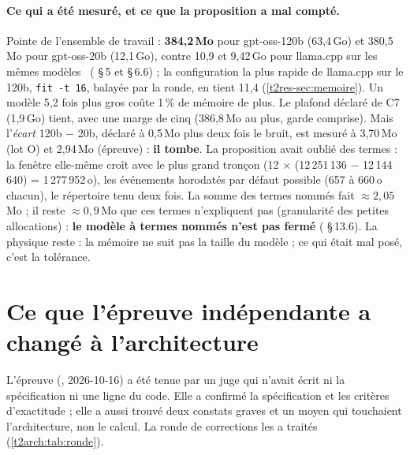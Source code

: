 \paragraph{Ce qui a été mesuré, et ce que la proposition a mal compté.} Pointe de l'ensemble de travail : \textbf{384,2\,Mo} pour gpt-oss-120b (63,4\,Go) et 380,5\,Mo pour gpt-oss-20b (12,1\,Go), contre 10,9 et 9,42\,Go pour llama.cpp sur les mêmes modèles \mes~( §\,5 et §\,6.6) ; la configuration la plus rapide de llama.cpp sur le 120b, \texttt{fit -t 16}, balayée par la ronde, en tient 11,4 (\cref{t2res-sec:memoire}). Un modèle 5,2 fois plus gros coûte 1\,\% de mémoire de plus. Le plafond déclaré de C7 (1,9\,Go) tient, avec une marge de cinq (386,8\,Mo au plus, garde comprise). Mais l'\emph{écart} 120b $-$ 20b, déclaré à 0,5\,Mo plus deux fois le bruit, est mesuré à 3,70\,Mo (lot O) et 2,94\,Mo (épreuve) : \textbf{il tombe}. La proposition avait oublié des termes : la fenêtre elle-même croît avec le plus grand tronçon (12 $\times$ (12\,251\,136 $-$ 12\,144\,640) = 1\,277\,952\,o), les événements horodatés par défaut possible (657 à 660\,o chacun), le répertoire tenu deux fois. La somme des termes nommés fait $\approx 2{,}05$\,Mo ; il reste $\approx 0{,}9$\,Mo que ces termes n'expliquent pas (granularité des petites allocations) : \textbf{le modèle à termes nommés n'est pas fermé} ( §\,13.6). La physique reste : la mémoire ne suit pas la taille du modèle ; ce qui était mal posé, c'est la tolérance.

\section{Ce que l'épreuve indépendante a changé à l'architecture}\label{t2arch:sec:epreuve}

L'épreuve (, 2026-10-16) a été tenue par un juge qui n'avait écrit ni la spécification ni une ligne du code. Elle a confirmé la spécification et les critères d'exactitude ; elle a aussi trouvé deux constats graves et un moyen qui touchaient l'architecture, non le calcul. La ronde de corrections les a traités (\cref{t2arch:tab:ronde}).

